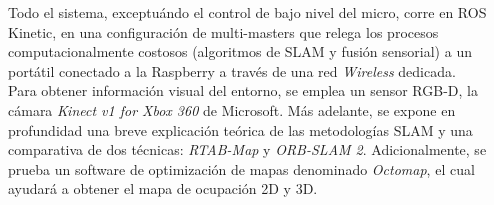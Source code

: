 \documentclass[a4paper,twoside]{article}
\begin{document}
Todo el sistema, exceptuándo el control de bajo nivel del micro, corre en ROS Kinetic, en una configuración de multi-masters que relega los procesos computacionalmente costosos
(algoritmos de SLAM y fusión sensorial) a un portátil conectado a la Raspberry a través de una red \textit{Wireless} dedicada.\\

Para obtener información visual del entorno, se emplea un sensor RGB-D, la cámara \textit{Kinect v1 for Xbox 360} de Microsoft.
Más adelante, se expone en profundidad una breve explicación teórica de las metodologías SLAM y una comparativa de dos técnicas: \textit{RTAB-Map} y \textit{ORB-SLAM 2}. Adicionalmente, se prueba un software de optimización de mapas denominado \textit{Octomap}, el cual ayudará a obtener el mapa de ocupación 2D y 3D.

\newpage


\newpage


\newpage


\newpage

\nocite{murORB2}
\nocite{rtabmap}
\nocite{hornung13auro}
\nocite{MooreStouchKeneralizedEkf2014}
\nocite{PyCmdMessenger}
\nocite{CmdMessenger}
\nocite{WinNT}
\nocite{atmega}
\nocite{mpu6050_datasheet}
\nocite{mpu6050_regmap}
\nocite{intSLAM_I}
\nocite{intSLAM_II}
\end{document}
